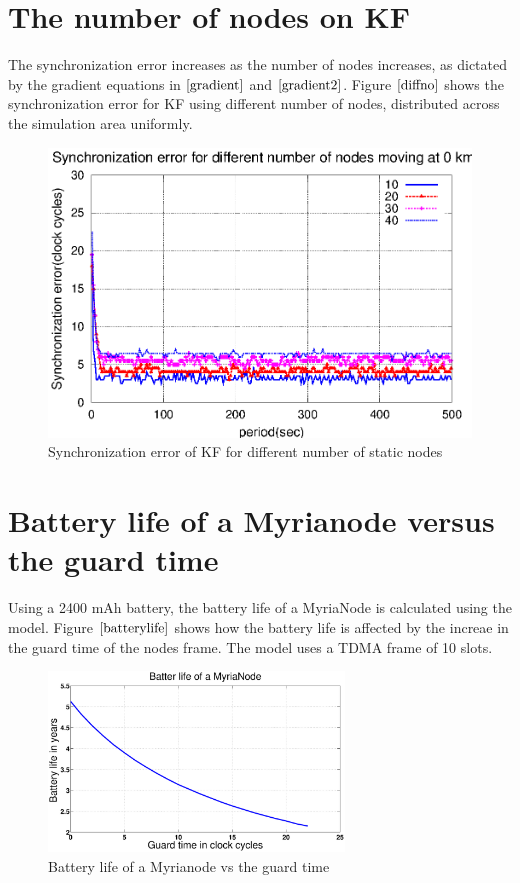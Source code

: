 \documentclass[a4paper,10pt]{report}
\begin{document}
\section{\textbf{The number of nodes on KF}}
The synchronization error increases as the number of nodes increases, as dictated by the gradient equations in $\cite{gradient}$ and $\cite{gradient2}$. Figure $\ref{diffno}$ shows the synchronization error for KF using different number of nodes, distributed across the simulation area uniformly.
\begin{figure}[!h]
\centering
\includegraphics[width= 0.7 \textwidth]{diffno}
\caption{Synchronization error of KF for different number of static nodes}
\label{diffno}
\end{figure}
\section{Battery life of a Myrianode versus the guard time}
Using a 2400 mAh battery, the battery life of a MyriaNode is calculated using the model. Figure $\ref{batterylife}$ shows how the battery life is affected by the increae in the guard time of the nodes frame. The model uses a TDMA frame of 10 slots.
\begin{figure}[!h]
\centering
\includegraphics[width = 0.7\textwidth]{guardsave}
\caption{Battery life of a Myrianode vs the guard time}
\label{batterylife}
\end{figure}
\end{document}
